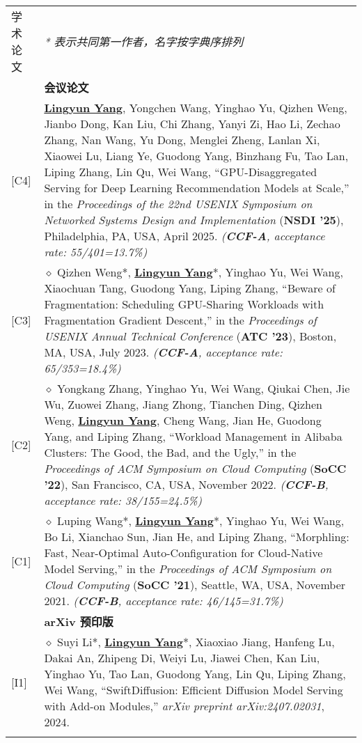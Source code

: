 \documentclass[letterpaper, 10pt]{article}
\begin{document}
\begin{longtable}{p{0.7in}p{6.0in}}
{学术论文}
& \textit{* 表示共同第一作者，名字按字典序排列} \\
& \textbf{会议论文} \\
\hfill [C4]
& \textbf{\underline{Lingyun Yang}}, Yongchen Wang, Yinghao Yu, Qizhen Weng, Jianbo Dong, Kan Liu, Chi Zhang, Yanyi Zi, Hao Li, Zechao Zhang, Nan Wang, Yu Dong, Menglei Zheng, Lanlan Xi, Xiaowei Lu, Liang Ye, Guodong Yang, Binzhang Fu, Tao Lan, Liping Zhang, Lin Qu, Wei Wang, “GPU-Disaggregated Serving for Deep Learning Recommendation Models at Scale,” in the \textit{Proceedings of the 22nd USENIX Symposium on Networked Systems Design and Implementation} (\textbf{NSDI '25}), Philadelphia, PA, USA, April 2025. \textit{(\textbf{CCF-A}, acceptance rate: 55/401=13.7\%)} \\
\hfill [C3]
& $\diamond$ Qizhen Weng*, \textbf{\underline{Lingyun Yang}}*, Yinghao Yu, Wei Wang, Xiaochuan Tang, Guodong Yang, Liping Zhang, “Beware of Fragmentation: Scheduling GPU-Sharing Workloads with Fragmentation Gradient Descent,” in the \textit{Proceedings of USENIX Annual Technical Conference} (\textbf{ATC '23}), Boston, MA, USA, July 2023. \textit{(\textbf{CCF-A}, acceptance rate: 65/353=18.4\%)} \\
\hfill [C2]
& $\diamond$ Yongkang Zhang, Yinghao Yu, Wei Wang, Qiukai Chen, Jie Wu, Zuowei Zhang, Jiang Zhong, Tianchen Ding, Qizhen Weng, \textbf{\underline{Lingyun Yang}}, Cheng Wang, Jian He, Guodong Yang, and Liping Zhang, “Workload Management in Alibaba Clusters: The Good, the Bad, and the Ugly,” in the \textit{Proceedings of ACM Symposium on Cloud Computing} (\textbf{SoCC '22}), San Francisco, CA, USA, November 2022. \textit{(\textbf{CCF-B}, acceptance rate: 38/155=24.5\%)} \\
\hfill [C1]
& $\diamond$ Luping Wang*, \textbf{\underline{Lingyun Yang}}*, Yinghao Yu, Wei Wang, Bo Li, Xianchao Sun, Jian He, and Liping Zhang, “Morphling: Fast, Near-Optimal Auto-Configuration for Cloud-Native Model Serving,” in the \textit{Proceedings of ACM Symposium on Cloud Computing} (\textbf{SoCC '21}), Seattle, WA, USA, November 2021. \textit{(\textbf{CCF-B}, acceptance rate: 46/145=31.7\%)} \\
& \textbf{arXiv 预印版} \\
\hfill [I1]
& $\diamond$ Suyi Li*, \textbf{\underline{Lingyun Yang}}*, Xiaoxiao Jiang, Hanfeng Lu, Dakai An, Zhipeng Di, Weiyi Lu, Jiawei Chen, Kan Liu, Yinghao Yu, Tao Lan, Guodong Yang, Lin Qu, Liping Zhang, Wei Wang, “SwiftDiffusion: Efficient Diffusion Model Serving with Add-on Modules,” \textit{arXiv preprint arXiv:2407.02031}, 2024. \\
& \\


\end{longtable}
\end{document}
